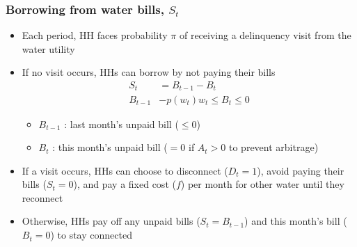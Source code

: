 \documentclass[aspectratio=149]{beamer}
\begin{document}
\begin{frame}
\frametitle{Borrowing from water bills, $S_t$}

\begin{itemize}
\item Each period, HH faces probability $\pi$ of receiving a delinquency visit from the water utility
\item If no visit occurs, HHs can borrow by not paying their bills
\begin{align*}
S_t &= B_{t-1} -  B_{t} \\
B_{t-1} &-  p(w_t) w_t \leq B_{t} \leq 0 
\end{align*}

\begin{itemize}
  \item $B_{t-1}$ : last month's unpaid bill { \footnotesize ($\leq0$) }
  \item $B_{t}$ : this month's unpaid bill { \footnotesize ($=0$ if $A_t>0$ to prevent arbitrage)}
\end{itemize}
\vspace{2mm}


\item If a visit occurs, HHs can choose to disconnect ($D_{t}=1$), avoid paying their bills ($S_t  = 0$), and pay a fixed cost ($f$) per month for other water until they reconnect

\item Otherwise, HHs pay off any unpaid bills ($S_t=B_{t-1}$) and this month's bill ($B_{t}=0$) to stay connected

\end{itemize}

\end{frame}


\end{document}
